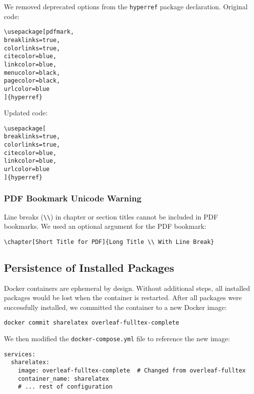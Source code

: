 We removed deprecated options from the \verb|hyperref| package declaration. Original code:

\begin{verbatim}
\usepackage[pdfmark, 
breaklinks=true, 
colorlinks=true,
citecolor=blue,
linkcolor=blue,
menucolor=black,
pagecolor=black,
urlcolor=blue
]{hyperref}
\end{verbatim}

Updated code:

\begin{verbatim}
\usepackage[
breaklinks=true, 
colorlinks=true,
citecolor=blue,
linkcolor=blue,
urlcolor=blue
]{hyperref}
\end{verbatim}

\subsubsection{PDF Bookmark Unicode Warning}

Line breaks (\verb|\\|) in chapter or section titles cannot be included in PDF bookmarks. We used an optional argument for the PDF bookmark:

\begin{verbatim}
\chapter[Short Title for PDF]{Long Title \\ With Line Break}
\end{verbatim}

\subsection{Persistence of Installed Packages}

Docker containers are ephemeral by design. Without additional steps, all installed packages would be lost when the container is restarted. After all packages were successfully installed, we committed the container to a new Docker image:

\begin{verbatim}
docker commit sharelatex overleaf-fulltex-complete
\end{verbatim}

We then modified the \verb|docker-compose.yml| file to reference the new image:

\begin{verbatim}
services:
  sharelatex:
    image: overleaf-fulltex-complete  # Changed from overleaf-fulltex
    container_name: sharelatex
    # ... rest of configuration
\end{verbatim}

